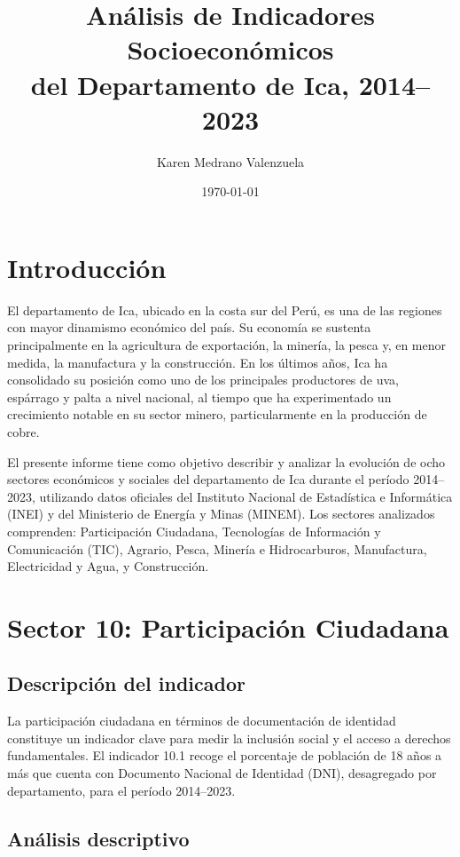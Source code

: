 \documentclass[12pt]{article}
\title{\textbf{Análisis de Indicadores Socioeconómicos\\del Departamento de Ica, 2014--2023}}
\author{Karen Medrano Valenzuela}
\date{\today}
\begin{document}
\maketitle
\tableofcontents
\newpage

\section{Introducción}
El departamento de Ica, ubicado en la costa sur del Perú, es una de las
regiones con mayor dinamismo económico del país. Su economía se sustenta
principalmente en la agricultura de exportación, la minería, la pesca y,
en menor medida, la manufactura y la construcción. En los últimos años,
Ica ha consolidado su posición como uno de los principales productores de
uva, espárrago y palta a nivel nacional, al tiempo que ha experimentado
un crecimiento notable en su sector minero, particularmente en la
producción de cobre.

El presente informe tiene como objetivo describir y analizar la evolución
de ocho sectores económicos y sociales del departamento de Ica durante
el período 2014--2023, utilizando datos oficiales del Instituto Nacional
de Estadística e Informática (INEI) y del Ministerio de Energía y Minas
(MINEM). Los sectores analizados comprenden: Participación Ciudadana,
Tecnologías de Información y Comunicación (TIC), Agrario, Pesca,
Minería e Hidrocarburos, Manufactura, Electricidad y Agua, y Construcción.

\section{Sector 10: Participación Ciudadana}
\subsection{Descripción del indicador}
La participación ciudadana en términos de documentación de identidad
constituye un indicador clave para medir la inclusión social y el acceso
a derechos fundamentales. El indicador 10.1 recoge el porcentaje de
población de 18 años a más que cuenta con Documento Nacional de Identidad
(DNI), desagregado por departamento, para el período 2014--2023.

\subsection{Análisis descriptivo}
\end{document}
